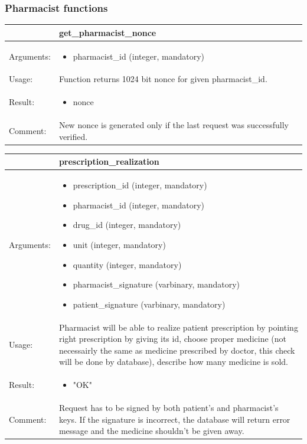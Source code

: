 \subsubsection{Pharmacist functions}

\begin{table}[h]
    \begin{tabular}{| p{6cm} | p{7.75cm} |}
    \hline
     & get\_pharmacist\_nonce \\ \hline
    Arguments: &  \begin{itemize}
    	\item pharmacist\_id (integer, mandatory)
	\end{itemize}     \\ \hline
    Usage: & Function returns 1024 bit nonce for given pharmacist\_id. \\ \hline
    Result: & \begin{itemize}
    	\item nonce
	\end{itemize}     \\ \hline	
			Comment: & New nonce is generated only if the last request was successfully verified.\\ \hline
    \end{tabular}
\end{table}
\begin{table}[h]
    \begin{tabular}{| p{6cm} | p{7.75cm} |}
    \hline
     & prescription\_realization \\ \hline
    Arguments: &  \begin{itemize}
    	\item prescription\_id (integer, mandatory)
		\item pharmacist\_id (integer, mandatory)
		\item drug\_id (integer, mandatory)
		\item unit (integer, mandatory)
		\item quantity (integer, mandatory)
		\item pharmacist\_signature (varbinary, mandatory)
		\item patient\_signature (varbinary, mandatory)

	\end{itemize}     \\ \hline
    Usage: & Pharmacist will be able to realize patient prescription by pointing right prescription by giving its id, choose proper medicine (not necessairly the same as medicine prescribed by doctor, this check will be done by database), describe how many medicine is sold.\\ \hline
    Result: & \begin{itemize}
    	\item "OK"
	\end{itemize}     \\ \hline	
	Comment: & Request has to be signed by both patient's and pharmacist's keys. If the signature is incorrect, the database will return error message and the medicine shouldn't be given away.\\ \hline
    \end{tabular}
\end{table}

